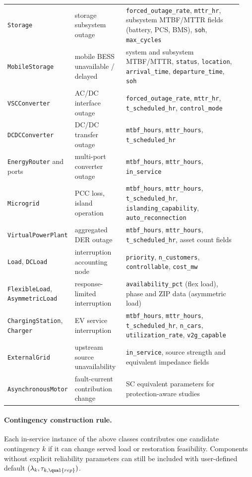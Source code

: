 \begin{longtable}{L{0.20\linewidth}L{0.22\linewidth}L{0.52\linewidth}}
\texttt{Storage} & storage subsystem outage & \texttt{forced\_outage\_rate}, \texttt{mttr\_hr}, subsystem MTBF/MTTR fields (battery, PCS, BMS), \texttt{soh}, \texttt{max\_cycles} \\
\texttt{MobileStorage} & mobile BESS unavailable / delayed & system and subsystem MTBF/MTTR, \texttt{status}, \texttt{location}, \texttt{arrival\_time}, \texttt{departure\_time}, \texttt{soh} \\
\texttt{VSCConverter} & AC/DC interface outage & \texttt{forced\_outage\_rate}, \texttt{mttr\_hr}, \texttt{t\_scheduled\_hr}, \texttt{control\_mode} \\
\texttt{DCDCConverter} & DC/DC transfer outage & \texttt{mtbf\_hours}, \texttt{mttr\_hours}, \texttt{t\_scheduled\_hr} \\
\texttt{EnergyRouter} and ports & multi-port converter outage & \texttt{mtbf\_hours}, \texttt{mttr\_hours}, \texttt{in\_service} \\
\texttt{Microgrid} & PCC loss, island operation & \texttt{mtbf\_hours}, \texttt{mttr\_hours}, \texttt{t\_scheduled\_hr}, \texttt{islanding\_capability}, \texttt{auto\_reconnection} \\
\texttt{VirtualPowerPlant} & aggregated DER outage & \texttt{mtbf\_hours}, \texttt{mttr\_hours}, \texttt{t\_scheduled\_hr}, asset count fields \\
\texttt{Load}, \texttt{DCLoad} & interruption accounting node & \texttt{priority}, \texttt{n\_customers}, \texttt{controllable}, \texttt{cost\_mw} \\
\texttt{FlexibleLoad}, \texttt{AsymmetricLoad} & response-limited interruption & \texttt{availability\_pct} (flex load), phase and ZIP data (asymmetric load) \\
\texttt{ChargingStation}, \texttt{Charger} & EV service interruption & \texttt{mtbf\_hours}, \texttt{mttr\_hours}, \texttt{t\_scheduled\_hr}, \texttt{n\_cars}, \texttt{utilization\_rate}, \texttt{v2g\_capable} \\
\texttt{ExternalGrid} & upstream source unavailability & \texttt{in\_service}, source strength and equivalent impedance fields \\
\texttt{AsynchronousMotor} & fault-current contribution change & SC equivalent parameters for protection-aware studies \\
\bottomrule
\end{longtable}

\paragraph{Contingency construction rule.}
Each in-service instance of the above classes contributes one candidate
contingency \(k\) if it can change served load or restoration feasibility.
Components without explicit reliability parameters can still be included with
user-defined default \((\lambda_k,\tau_{k,\qual{rep}})\).

